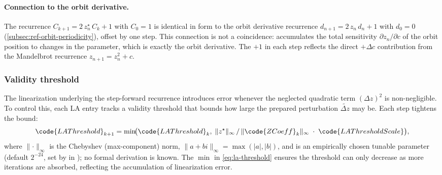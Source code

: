 \paragraph{Connection to the orbit derivative.}
The  recurrence
\(C_{k+1} = 2\,z_n^\star\,C_k + 1\) with \(C_0 = 1\)
is identical in form to the orbit derivative recurrence
\(d_{n+1} = 2\,z_n\,d_n + 1\) with \(d_0 = 0\)
(\cref{subsec:ref-orbit-periodicity}), offset by one step.
This connection is not a coincidence:  accumulates the total
sensitivity \(\partial z_n / \partial c\) of the orbit position to
changes in the parameter, which is exactly the orbit derivative.  The
\(+1\) in each step reflects the direct \(+\Delta c\) contribution from
the Mandelbrot recurrence \(z_{n+1} = z_n^2 + c\).

\subsubsection{Validity threshold}
\label{sec:la-threshold}

The linearization underlying the step-forward recurrence introduces error
whenever the neglected quadratic term \((\Delta z)^2\) is non-negligible.
To control this, each LA entry tracks a validity threshold
 that bounds how large the prepared perturbation
\(\tilde{\Delta z}\) may be.  Each step tightens the bound:
\begin{equation}
\code{LAThreshold}_{k+1}
  = \min\!\bigl(
      \code{LAThreshold}_k,\;
      \lVert z^\star\rVert_\infty \,/\,
      \lVert\code{ZCoeff}_k\rVert_\infty
      \;\cdot\;\code{LAThresholdScale}
    \bigr),
\label{eq:la-threshold}
\end{equation}
where \(\lVert\cdot\rVert_\infty\) is the Chebyshev (max-component) norm,
\(\lVert a + bi \rVert_\infty = \max(|a|, |b|)\), and
 is an empirically chosen tunable parameter
(default \(2^{-24}\), set by  in ); no formal derivation is known.
The \(\min\) in \eqref{eq:la-threshold} ensures the threshold can only decrease as more iterations are
absorbed, reflecting the accumulation of linearization error.

